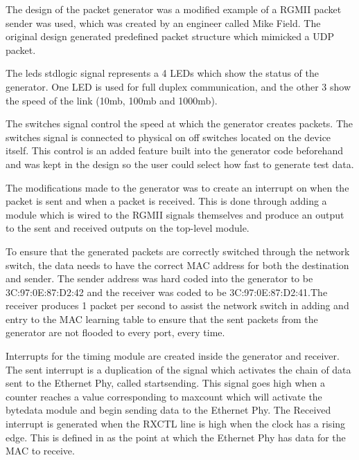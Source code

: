 The design of the packet generator was a modified example of a RGMII packet sender was used, which was created by an 
engineer called Mike Field. The original design generated predefined packet structure which mimicked a UDP packet. 



The leds std\textunderscore logic signal represents a 4 LEDs which show the status of the generator. One LED is used for 
full duplex communication, and the other 3 show the speed of the link (10mb, 100mb and 1000mb). 



The switches signal control the speed at which the generator creates packets. The switches signal is connected to physical 
on off switches located on the device itself.  This control is an added feature built into the generator code 
beforehand and was kept in the design so the user could select how fast to generate test data.



The modifications made to the generator was to create an interrupt on when the packet is sent and when a packet is 
received. This is done through adding a module which is wired to the RGMII signals themselves and 
produce an output to the sent and received outputs on the top-level module.



To ensure that the generated packets are correctly switched through the network switch, the data needs to have the 
correct MAC address for both the destination and sender. The sender address was hard coded into the generator to be 
3C:97:0E:87:D2:42 and the receiver was coded to be 3C:97:0E:87:D2:41.The receiver produces 1 packet per second to assist 
the network switch in adding and entry to the MAC learning table to ensure that the sent packets from the generator 
are not flooded to every port, every time. 

Interrupts for the timing module are created inside the generator and receiver. The sent interrupt is a duplication 
of the signal which activates the chain of data sent to the Ethernet Phy, called start\textunderscore sending. This 
signal goes high when a counter reaches a value corresponding to max\textunderscore count which will activate the 
byte\textunderscore data module and begin sending data to the Ethernet Phy. The Received interrupt is generated when 
the RX\textunderscore CTL line is high when the clock has a rising edge. This is defined in \cite{RGMIISpec} as the point at which the Ethernet Phy has data for the MAC to receive. 

